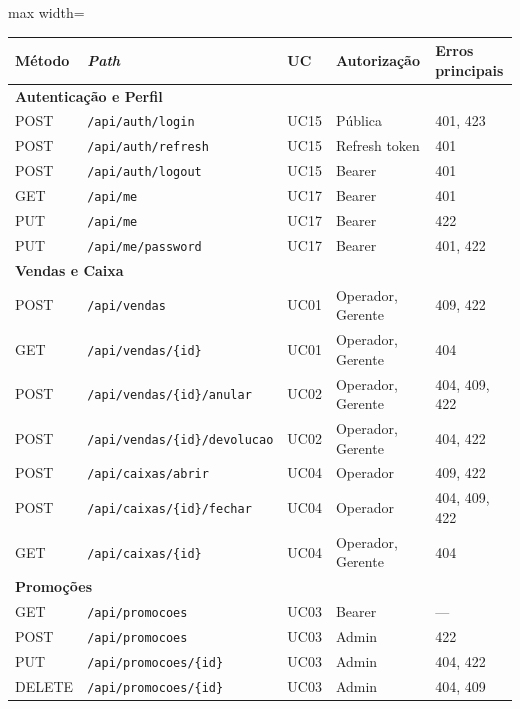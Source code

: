\begin{table}[H]
\centering\scriptsize
\renewcommand{\arraystretch}{1.05}
\begin{adjustbox}{max width=\textwidth}
\begin{tabular}{|p{1.4cm}|p{5cm}|p{1.2cm}|p{2.3cm}|p{2.2cm}|}
\hline
\textbf{Método} & \textbf{\textit{Path}} & \textbf{UC} & \textbf{Autorização} & \textbf{Erros principais} \\
\hline

\multicolumn{5}{|l|}{\cellcolor{gray!15}\textbf{Autenticação e Perfil}} \\
\hline
POST & \texttt{/api/auth/login} & UC15 & Pública & 401, 423 \\
\hline
POST & \texttt{/api/auth/refresh} & UC15 & Refresh token & 401 \\
\hline
POST & \texttt{/api/auth/logout} & UC15 & Bearer & 401 \\
\hline
GET & \texttt{/api/me} & UC17 & Bearer & 401 \\
\hline
PUT & \texttt{/api/me} & UC17 & Bearer & 422 \\
\hline
PUT & \texttt{/api/me/password} & UC17 & Bearer & 401, 422 \\
\hline

\multicolumn{5}{|l|}{\cellcolor{gray!15}\textbf{Vendas e Caixa}} \\
\hline
POST & \texttt{/api/vendas} & UC01 & Operador, Gerente & 409, 422 \\
\hline
GET & \texttt{/api/vendas/\{id\}} & UC01 & Operador, Gerente & 404 \\
\hline
POST & \texttt{/api/vendas/\{id\}/anular} & UC02 & Operador, Gerente & 404, 409, 422 \\
\hline
POST & \texttt{/api/vendas/\{id\}/devolucao} & UC02 & Operador, Gerente & 404, 422 \\
\hline
POST & \texttt{/api/caixas/abrir} & UC04 & Operador & 409, 422 \\
\hline
POST & \texttt{/api/caixas/\{id\}/fechar} & UC04 & Operador & 404, 409, 422 \\
\hline
GET & \texttt{/api/caixas/\{id\}} & UC04 & Operador, Gerente & 404 \\
\hline

\multicolumn{5}{|l|}{\cellcolor{gray!15}\textbf{Promoções}} \\
\hline
GET & \texttt{/api/promocoes} & UC03 & Bearer & --- \\
\hline
POST & \texttt{/api/promocoes} & UC03 & Admin & 422 \\
\hline
PUT & \texttt{/api/promocoes/\{id\}} & UC03 & Admin & 404, 422 \\
\hline
DELETE & \texttt{/api/promocoes/\{id\}} & UC03 & Admin & 404, 409 \\
\hline


\end{tabular}
\end{adjustbox}
\end{table}
